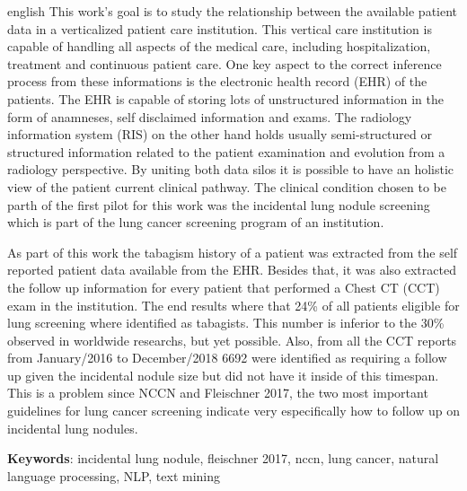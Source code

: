 \documentclass[
	12pt,				%
	openany,			%
  oneside,      %
	a4paper,			%
	brazil,			%
	french,			%
	spanish,			%
	english       %
	]{abntex2}
\begin{document}
\begin{resumo}[Abstract]
 \begin{otherlanguage*}{english}
   This work's goal is to study the relationship between the available patient data in a verticalized patient care institution. This vertical care institution is capable of handling all aspects of the medical care, including hospitalization, treatment and continuous patient care. One key aspect to the correct inference process from these informations is the electronic health record (EHR) of the patients. The EHR is capable of storing lots of unstructured information in the form of anamneses, self disclaimed information and exams. The radiology information system (RIS) on the other hand holds usually semi-structured or structured information related to the patient examination and evolution from a radiology perspective. By uniting both data silos it is possible to have an holistic view of the patient current clinical pathway. The clinical condition chosen to be parth of the first pilot for this work was the incidental lung nodule screening which is part of the lung cancer screening program of an institution.

   As part of this work the tabagism history of a patient was extracted from the self reported patient data available from the EHR. Besides that, it was also extracted the follow up information for every patient that performed a Chest CT (CCT) exam in the institution. The end results where that 24\% of all patients eligible for lung screening where identified as tabagists. This number is inferior to the 30\% observed in worldwide researchs, but yet possible. Also, from all the CCT reports from January/2016 to December/2018 6692 were identified as requiring a follow up given the incidental nodule size but did not have it inside of this timespan. This is a problem since NCCN and Fleischner 2017, the two most important guidelines for lung cancer screening indicate very especifically how to follow up on incidental lung nodules.
 
   \textbf{Keywords}: incidental lung nodule, fleischner 2017, nccn, lung cancer, natural language processing, NLP, text mining 
 \end{otherlanguage*}
\end{resumo}

\listoffigures*
\cleardoublepage

\listoftables*
\cleardoublepage
\end{document}
